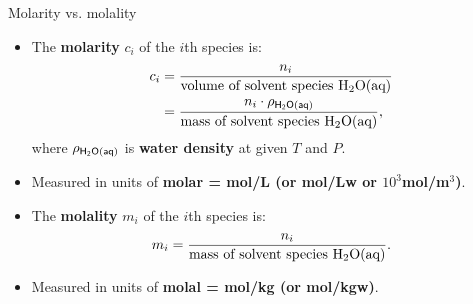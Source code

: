 %
\begin{frame}{Molarity vs. molality}
%
\lcol
\vskip 20pt
\begin{itemize}
\item The \textbf{molarity} $c_{i}$ of the $i$th species is:
\begin{alignat*}{2}
c_{i} & = \frac{n_{i}}{\text{volume of solvent species H\ensuremath{_{2}}O(aq)}} \\
	& = \frac{n_{i} \cdot \rho_{\sf H{_{2}}O(aq)}}{\text{mass of solvent species H\ensuremath{_{2}}O(aq)}},
\end{alignat*}
where $\rho_{\sf H{_{2}}O(aq)}$ is \textbf{water density} at given $T$ and $P$.
\item Measured in units of {\bf \alert{molar} = mol/L (or mol/Lw or  $10^3$mol/m$^3$)}. 
\end{itemize}
\rcol
\begin{itemize}
\item The \textbf{molality} $m_{i}$ of the $i$th species is:
\[
m_{i}=\frac{n_{i}}{\text{mass of solvent species H\ensuremath{_{2}}O(aq)}}.
\]
\item Measured in units of {\bf \alert{molal} = mol/kg (or mol/kgw)}. 
\end{itemize}
\ecol
\end{frame}
%
%
